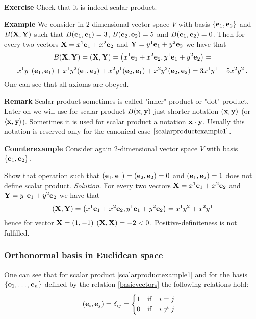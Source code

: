\documentclass[12pt]{article}
\numberwithin{equation}{section}
\begin{document}
{\bf Exercise}  Check that it is indeed scalar product.

\smallskip

{\bf Example} We consider in $2$-dimensional 
vector space $V$ with basis $\{{\bf e}_1,{\bf e}_2\}$ and
$B({\bf X},{\bf Y})$ such that $B({\bf e}_1,{\bf e}_1)=3$,  $B({\bf e}_2,{\bf e}_2)=5$ and  $B({\bf e}_1,{\bf e}_2)=0$.
Then for every two vectors ${\bf X}=x^1{\bf e}_1+x^2{\bf e}_2$ and ${\bf Y}=y^1{\bf e}_1+y^2{\bf e}_2$ we have that
                        $$
     B({\bf X},{\bf Y}) =\left({\bf X},{\bf Y}\right)=\left(x^1{\bf e}_1+x^2{\bf e}_2,y^1{\bf e}_1+y^2{\bf e}_2\right)=
              $$
              $$
   x^1y^1({\bf e}_1,{\bf e}_1)+x^1y^2({\bf e}_1,{\bf e}_2)+
   x^2y^1({\bf e}_2,{\bf e}_1)+
   x^2y^2({\bf e}_2,{\bf e}_2)=
      3x^1y^1+5x^2y^2\,.
                        $$
One can see that all axioms are obeyed.


{\bf Remark}
Scalar product sometimes is called "inner" product
 or "dot" product.
Later on we will use for scalar product $B({\bf x},{\bf y})$ just shorter notation
$({\bf x},{\bf y})$ (or $\langle{\bf x},{\bf y}\rangle$).
Sometimes it is used for scalar product a notation ${\bf x} \cdot {\bf y}$.
Usually this notation is reserved only for
the canonical case $\eqref{scalarproductexample1}$.

\smallskip



{\bf Counterexample}  Consider  again $2$-dimensional 
vector space $V$ with basis $\{{\bf e}_1,{\bf e}_2\}$.


Show that operation such that $({\bf e}_1,{\bf e}_1)=({\bf e}_2,{\bf e}_2)=0$ and $({\bf e}_1,{\bf e}_2)=1$
does not define scalar product.
{\it Solution}. For every two vectors ${\bf X}=x^1{\bf e}_1+x^2{\bf e}_2$ and 
${\bf Y}=y^1{\bf e}_1+y^2{\bf e}_2$ we have that
                        $$
\left({\bf X},{\bf Y}\right)=\left(x^1{\bf e}_1+x^2{\bf e}_2,y^1{\bf e}_1+y^2{\bf e}_2\right)=x^1y^2+x^2y^1
              $$
hence for vector ${\bf X}=(1,-1)$ $({\bf X},{\bf X})=-2<0$. Positive-definiteness is not fulfilled.

\subsubsection {Orthonormal basis in Euclidean space}

One can see that for scalar product  \eqref{scalarproductexample1}
and for the basis $\{{\bf e}_1,\dots,{\bf e}_n\}$ defined by the relation \eqref{basicvectors}
the following relations hold:
\begin{equation}\label{orthonormalbasis}
    ({\bf e}_i,{\bf e}_j)=\delta_{ij}= \begin {cases}
                  1\quad {\rm if}\quad i=j\\
              0\quad {\rm if}\quad i\not=j
                         \end{cases}
\end{equation}
\end{document}

